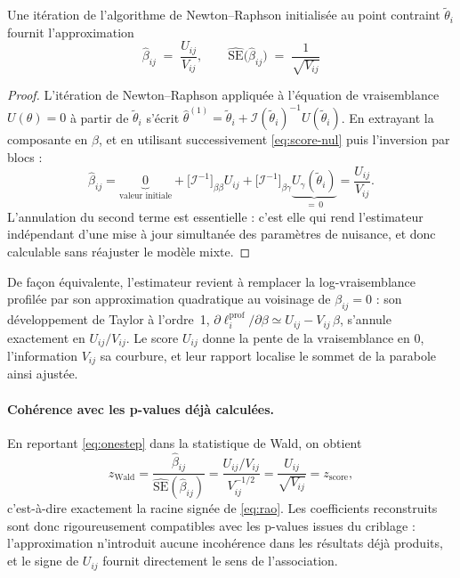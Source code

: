 \documentclass[11pt,a4paper]{article}
\begin{document}
\begin{proposition}
\label{prop:onestep}
Une itération de l'algorithme de Newton--Raphson initialisée au point contraint
$\tilde{\theta}_i$ fournit l'approximation
\begin{equation}
  \boxed{\;
  \hat{\beta}_{ij} \;=\; \frac{U_{ij}}{V_{ij}},
  \qquad
  \widehat{\mathrm{SE}}\bigl(\hat{\beta}_{ij}\bigr) \;=\; \frac{1}{\sqrt{V_{ij}}} \; }
  \label{eq:onestep}
\end{equation}
\end{proposition}
\vspace{0.5cm}
\begin{proof}
L'itération de Newton--Raphson appliquée à l'équation de vraisemblance
$U(\theta) = 0$ à partir de $\tilde{\theta}_i$ s'écrit
$\hat{\theta}^{(1)} = \tilde{\theta}_i + \mathcal{I}(\tilde{\theta}_i)^{-1} U(\tilde{\theta}_i)$.
En extrayant la composante en $\beta$, et en utilisant successivement
\eqref{eq:score-nul} puis l'inversion par blocs :
\[
  \hat{\beta}_{ij}
  = \underbrace{0}_{\text{valeur initiale}}
  + \bigl[\mathcal{I}^{-1}\bigr]_{\beta\beta} U_{ij}
  + \bigl[\mathcal{I}^{-1}\bigr]_{\beta\gamma} \underbrace{U_{\gamma}(\tilde{\theta}_i)}_{=\,0}
  = \frac{U_{ij}}{V_{ij}} .
\]
L'annulation du second terme est essentielle : c'est elle qui rend l'estimateur
indépendant d'une mise à jour simultanée des paramètres de nuisance, et donc
calculable sans réajuster le modèle mixte.
\end{proof}

\begin{remark}[Interprétation]
De façon équivalente, l'estimateur revient à remplacer la log-vraisemblance
profilée par son approximation quadratique au voisinage de $\beta_{ij} = 0$ :
son développement de Taylor à l'ordre~1,
$\partial \ell_i^{\mathrm{prof}} / \partial\beta \simeq U_{ij} - V_{ij}\,\beta$,
s'annule exactement en $U_{ij}/V_{ij}$. Le score $U_{ij}$ donne la pente de la
vraisemblance en $0$, l'information $V_{ij}$ sa courbure, et leur rapport
localise le sommet de la parabole ainsi ajustée.
\end{remark}

\paragraph{Cohérence avec les p-values déjà calculées.}
En reportant \eqref{eq:onestep} dans la statistique de Wald, on obtient
\begin{equation}
  z_{\mathrm{Wald}}
  = \frac{\hat{\beta}_{ij}}{\widehat{\mathrm{SE}}(\hat{\beta}_{ij})}
  = \frac{U_{ij}/V_{ij}}{V_{ij}^{-1/2}}
  = \frac{U_{ij}}{\sqrt{V_{ij}}}
  = z_{\mathrm{score}} ,
  \label{eq:equiv-wald}
\end{equation}
c'est-à-dire exactement la racine signée de \eqref{eq:rao}. Les coefficients
reconstruits sont donc rigoureusement compatibles avec les p-values issues du
criblage : l'approximation n'introduit aucune incohérence dans les résultats
déjà produits, et le signe de $U_{ij}$ fournit directement le sens de
l'association.
\end{document}
